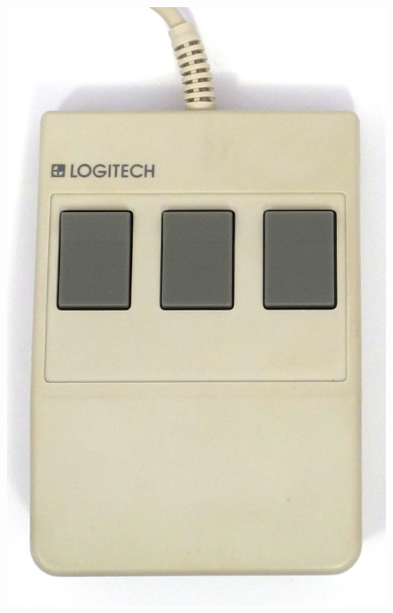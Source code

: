\documentclass[11pt, a4paper]{article}
\begin{document}
\begin{figure}[h]
    \centering
    \includegraphics[scale=0.45]{1985_logitech_c7_mouse/top_30.jpg}

\end{figure}
\end{document}
